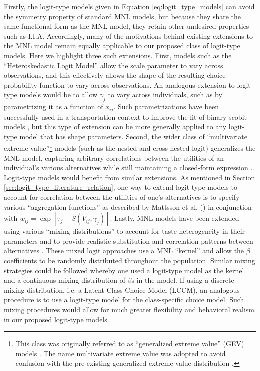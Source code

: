 Firstly, the logit-type models given in Equation \ref{eq:logit_type_models} can avoid the symmetry property of standard MNL models, but because they share the same functional form as the MNL model, they retain other undesired properties such as I.I.A. Accordingly, many of the motivations behind existing extensions to the MNL model remain equally applicable to our proposed class of logit-type models. Here we highlight three such extensions. First, models such as the ``Heteroskedastic Logit Model'' \citep{steckel_heterogeneous_1988, recker_discrete_1995, bhat_heteroscedastic_1995} allow the scale parameter to vary across observations, and this effectively allows the shape of the resulting choice probability function to vary across observations. An analogous extension to logit-type models would be to allow $\gamma_j$ to vary across individuals, such as by parametrizing it as a function of $x_{ij}$. Such parametrizations have been successfully used in a transportation context to improve the fit of binary scobit models \citep{zhang_scobit-based_2010, wu_analysis_2012}, but this type of extension can be more generally applied to any logit-type model that has shape parameters. Second, the wider class of ``multivariate extreme value''\footnote{This class was originally referred to as ``generalized extreme value'' (GEV) models \citep{mcfadden_econometric_1980}. The name multivariate extreme value was adopted to avoid confusion with the pre-existing generalized extreme value distribution \citep{jenkinson_frequency_1955}.} models (such as the nested and cross-nested logit) generalizes the MNL model, capturing arbitrary correlations between the utilities of an individual's various alternatives while still maintaining a closed-form expression \citep{train_discrete_2009}. Logit-type models would benefit from similar extensions. As mentioned in Section \ref{sec:logit_type_literature_relation}, one way to extend logit-type models to account for correlation between the utilities of one's alternatives is to specify various ``aggregation functions'' as described by Mattsson et al. (\citeyear{mattsson_extreme_2014}) in conjunction with $w_{ij} = \exp \left[ \tau_j + S \left( V_{ij}, \gamma_j \right) \right]$. Lastly, MNL models have been extended using various ``mixing distributions'' to account for taste heterogeneity in their parameters and to provide realistic substitution and correlation patterns between alternatives \citep{revelt_mixed_1998}. These mixed logit approaches use a MNL ``kernel'' and allow the $\beta$ coefficients to be randomly distributed throughout the population. Similar mixing strategies could be followed whereby one used a logit-type model as the kernel and a continuous mixing distribution of $\beta$s in the model. If using a discrete mixing distribution, i.e. a Latent Class Choice Model (LCCM), an analogous procedure is to use a logit-type model for the class-specific choice model. Such mixing procedures would allow for much greater flexibility and behavioral realism in our proposed logit-type models.


